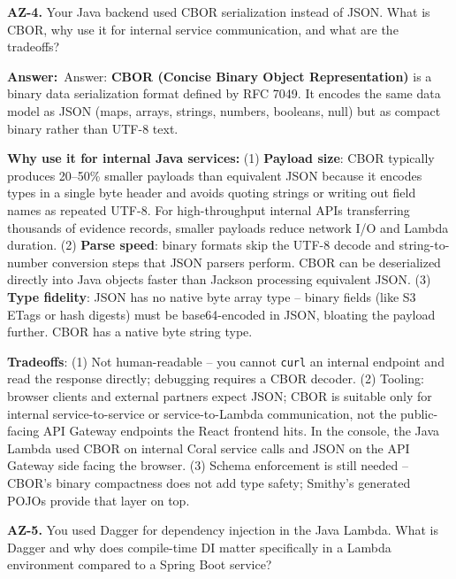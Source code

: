 \documentclass[letterpaper,10pt]{article}
\newlength{\boxwidth}
\newcommand{\answerlabel}{\noindent\textbf{\textcolor{answerblue}{Answer:}}~}
\begin{document}
\vspace{6pt}

\colorbox{qbg}{\begin{minipage}{\boxwidth}
\textbf{AZ-4.} Your Java backend used CBOR serialization instead of JSON. What is CBOR, why use it for internal service communication, and what are the tradeoffs?
\end{minipage}}

\vspace{2pt}
\answerlabel{Answer:} \textbf{CBOR (Concise Binary Object Representation)} is a binary data serialization format defined by RFC 7049. It encodes the same data model as JSON (maps, arrays, strings, numbers, booleans, null) but as compact binary rather than UTF-8 text.

\textbf{Why use it for internal Java services:} (1) \textbf{Payload size}: CBOR typically produces 20--50\% smaller payloads than equivalent JSON because it encodes types in a single byte header and avoids quoting strings or writing out field names as repeated UTF-8. For high-throughput internal APIs transferring thousands of evidence records, smaller payloads reduce network I/O and Lambda duration. (2) \textbf{Parse speed}: binary formats skip the UTF-8 decode and string-to-number conversion steps that JSON parsers perform. CBOR can be deserialized directly into Java objects faster than Jackson processing equivalent JSON. (3) \textbf{Type fidelity}: JSON has no native byte array type -- binary fields (like S3 ETags or hash digests) must be base64-encoded in JSON, bloating the payload further. CBOR has a native byte string type.

\textbf{Tradeoffs}: (1) Not human-readable -- you cannot \texttt{curl} an internal endpoint and read the response directly; debugging requires a CBOR decoder. (2) Tooling: browser clients and external partners expect JSON; CBOR is suitable only for internal service-to-service or service-to-Lambda communication, not the public-facing API Gateway endpoints the React frontend hits. In the console, the Java Lambda used CBOR on internal Coral service calls and JSON on the API Gateway side facing the browser. (3) Schema enforcement is still needed -- CBOR's binary compactness does not add type safety; Smithy's generated POJOs provide that layer on top.

\vspace{6pt}

\colorbox{qbg}{\begin{minipage}{\boxwidth}
\textbf{AZ-5.} You used Dagger for dependency injection in the Java Lambda. What is Dagger and why does compile-time DI matter specifically in a Lambda environment compared to a Spring Boot service?
\end{minipage}}
\end{document}
